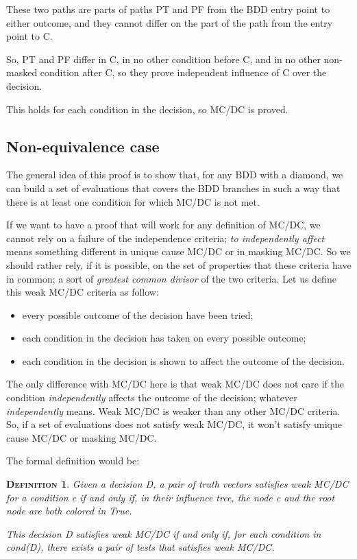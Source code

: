 \documentclass[a4paper,12pt,twoside]{article}
\newtheorem{definition}{\textsc{Definition}}
\begin{document}
These two paths are parts of paths PT and PF from the BDD entry point to
either outcome, and they cannot differ on the part of the path from the
entry point to C.

So, PT and PF differ in C, in no other condition before C, and in no
other non-masked condition after C, so they prove independent influence
of C over the decision.

This holds for each condition in the decision, so MC/DC is proved.

\subsection{Non-equivalence case}

The general idea of this proof is to show that, for any BDD with a
diamond, we can build a set of evaluations that covers the BDD
branches in such a way that there is at least one condition for which
MC/DC is not met.

If we want to have a proof that will work for any definition of MC/DC,
we cannot rely on a failure of the independence criteria; \textit{to
independently affect} means something different in unique cause MC/DC
or in masking MC/DC. So we should rather rely, if it is possible, on
the set of properties that these criteria have in common; a sort of
\textit{greatest common divisor} of the two criteria. Let us define
this weak MC/DC criteria as follow:

\begin{itemize}
\item every possible outcome of the decision have been tried;
\item each condition in the decision has taken on every possible outcome;
\item each condition in the decision is shown to affect the outcome of the
      decision.
\end{itemize}

The only difference with MC/DC here is that weak MC/DC does not care
if the condition \textit{independently} affects the outcome of the decision;
whatever \textit{independently} means. Weak MC/DC is weaker than any other
MC/DC criteria. So, if a set of evaluations does not satisfy weak MC/DC,
it won't satisfy unique cause MC/DC or masking MC/DC.

The formal definition would be:

\begin{definition}
  \label{def:weak-mcdc}
  Given a decision D, a pair of truth vectors satisfies weak MC/DC for
  a condition c if and only if, in their influence tree, the node c
  and the root node are both colored in True.

  This decision D satisfies weak MC/DC if and only if, for each
  condition in cond(D), there exists a pair of tests that satisfies
  weak MC/DC.
\end{definition}
\end{document}

